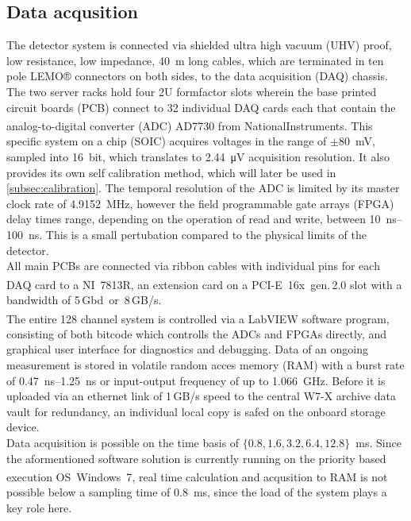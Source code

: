 \documentclass[
    aps,%
    twocolumn,%
    secnumarabic,%
    amssymb,%
    prd,%
    10pt%
    ]{revtex4-1}
\begin{document}
    \subsection{Data acqusition}\label{subsec:acqusition}
        The detector system is connected via shielded ultra high vacuum (UHV) proof, low resistance, low impedance, \mbox{\SI{40}{\meter}} long cables, which are terminated in ten pole LEMO® connectors on both sides, to the data acquisition (DAQ) chassis. The two server racks hold four 2U formfactor slots wherein the base printed circuit boards (PCB) connect to 32 individual DAQ cards each that contain the analog-to-digital converter (ADC) AD7730 from \mbox{NationalInstruments\textsuperscript{\textregistered}}. This specific system on a chip (SOIC) acquires voltages in the range of \mbox{$\pm$\SI{80}{\milli\volt}}, sampled into \mbox{\SI{16}{bit}}, which translates to \mbox{\SI{2.44}{\micro\volt}} acquisition resolution. It also provides its own self calibration method, which will later be used in \cref{subsec:calibration}. The temporal resolution of the ADC is limited by its master clock rate of \mbox{\SI{4.9152}{\mega\hertz}}, however the field programmable gate arrays (FPGA) delay times range, depending on the operation of read and write, between \mbox{\SIrange{10}{100}{\nano\second}}. This is a small pertubation compared to the physical limits of the detector.\\%
        All main PCBs are connected via ribbon cables with individual pins for each DAQ card to a \mbox{NI\textsuperscript{\textregistered} 7813R}, an extension card on a \mbox{PCI-E 16x gen.\,2.0} slot with a bandwidth of \mbox{5\,Gbd or 8\,GB/s.}\\%
        The entire 128 channel system is controlled via a \mbox{LabVIEW\textsuperscript{\textregistered}} software program, consisting of both bitcode which controlls the ADCs and FPGAs directly, and graphical user interface for diagnostics and debugging. Data of an ongoing measurement is stored in volatile random acces memory (RAM) with a burst rate of \mbox{\SIrange{0.47}{1,25}{\nano\second}} or input-output frequency of up to \mbox{\SI{1.066}{\giga\hertz}.} Before it is uploaded via an ethernet link of \mbox{1\,GB/s} speed to the central W7-X archive data vault for redundancy, an individual local copy is safed on the onboard storage device.\\%
        Data acquisition is possible on the time basis of \mbox{$\{0.8, 1.6, 3.2, 6.4, 12.8\}$\SI{}{\milli\second}.} Since the aformentioned software solution is currently running on the priority based execution \mbox{OS Windows 7\textsuperscript{\textregistered}}, real time calculation and acqusition to RAM is not possible below a sampling time of \mbox{\SI{0.8}{\milli\second},} since the load of the system plays a key role here.\\%
\end{document}
